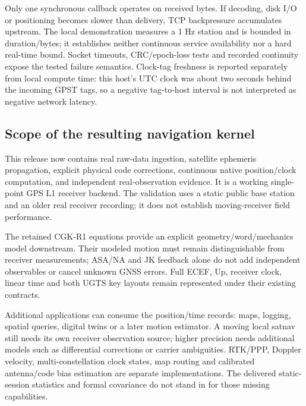 Only one synchronous callback operates on received bytes. If decoding, disk I/O
or positioning becomes slower than delivery, TCP backpressure accumulates upstream.
The local demonstration measures a 1 Hz station and is bounded in duration/bytes;
it establishes neither continuous service availability nor a hard real-time bound.
Socket timeouts, CRC/epoch-loss tests and recorded continuity expose the tested
failure semantics. Clock-tag freshness is reported separately from local compute
time: this host's UTC clock was about two seconds behind the incoming GPST tags,
so a negative tag-to-host interval is not interpreted as negative network latency.



\clearpage
\subsection{Scope of the resulting navigation kernel}
This release now contains real raw-data ingestion, satellite ephemeris propagation,
explicit physical code corrections, continuous native position/clock computation,
and independent real-observation evidence. It is a working single-point GPS L1
receiver backend. The validation uses a static public base station and an older
real receiver recording; it does not establish moving-receiver field performance.

The retained CGK-R1 equations provide an explicit geometry/word/mechanics model
downstream. Their modeled motion must remain distinguishable from receiver
measurements; ASA/NA and JK feedback alone do not add independent observables or
cancel unknown GNSS errors. Full ECEF, Up, receiver clock, linear time and both
UGTS key layouts remain represented under their existing contracts.

Additional applications can consume the position/time records: maps, logging,
spatial queries, digital twins or a later motion estimator. A moving local satnav
still needs its own receiver observation source; higher precision needs additional
models such as differential corrections or carrier ambiguities. RTK/PPP, Doppler
velocity, multi-constellation clock states, map routing and calibrated antenna/code
bias estimation are separate implementations. The delivered static-session
statistics and formal covariance do not stand in for those missing capabilities.

